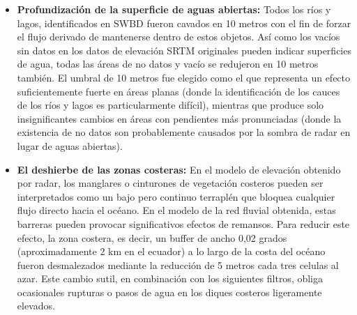 \documentclass[10pt,a4paper, twoside]{report}
\begin{document}
\begin{itemize}
	\item \textbf{Profundización de la superficie de aguas abiertas:} Todos los ríos y lagos, identificados en SWBD fueron cavados en 10 metros con el fin de forzar el flujo derivado de mantenerse dentro de estos objetos. Así como los vacíos sin datos en los datos de elevación SRTM originales pueden indicar superficies de agua, todas las áreas de no datos y vacío se redujeron en 10 metros también. El umbral de 10 metros fue elegido como el que representa un efecto suficientemente fuerte en áreas planas (donde la identificación de los cauces de los ríos y lagos es particularmente difícil), mientras que produce solo insignificantes cambios en áreas con pendientes más pronunciadas (donde la existencia de no datos son probablemente causados por la sombra de radar en lugar de aguas abiertas).
	
	\item \textbf{El deshierbe de las zonas costeras:} En el modelo de elevación obtenido por radar, los manglares o cinturones de vegetación costeros pueden ser interpretados como un bajo pero continuo terraplén que bloquea cualquier flujo directo hacia el océano. En el modelo de la red fluvial obtenida, estas barreras pueden provocar significativos efectos de remansos. Para reducir este efecto, la zona costera, es decir, un buffer de ancho 0,02 grados (aproximadamente 2 km en el ecuador) a lo largo de la costa del océano fueron desmalezados mediante la reducción de 5 metros cada tres celulas al azar. Este cambio sutil, en combinación con los siguientes filtros, obliga ocasionales rupturas o pasos de agua en los diques costeros ligeramente elevados.
	

\end{itemize}
\end{document}
